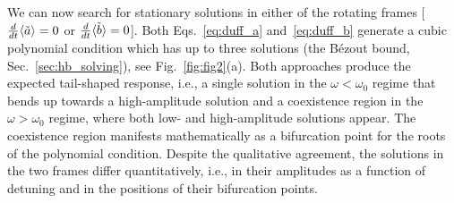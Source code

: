 We can now search for stationary solutions in either of the rotating frames [$\frac{d}{dt} \langle\tilde{a}\rangle = 0$ or $\frac{d}{dt} \langle\tilde{b}\rangle = 0$]. Both Eqs.~\eqref{eq:duff_a} and~\eqref{eq:duff_b} generate a cubic polynomial condition which has up to three solutions (the B\'{e}zout bound, Sec.~\ref{sec:hb_solving}), see Fig.~\ref{fig:fig2}(a). Both approaches produce the expected tail-shaped response, i.e., a single solution in the $\omega < \omega_0$ regime that bends up towards a high-amplitude solution and a coexistence region in the $\omega > \omega_0$ regime, where both low- and high-amplitude solutions appear. 
The coexistence region manifests mathematically as a bifurcation point for the roots of the polynomial condition. Despite the qualitative agreement, the solutions in the two frames differ quantitatively, i.e., in their amplitudes as a function of detuning and in the positions of their bifurcation points. 

